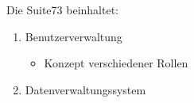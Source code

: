 Die Suite73 beinhaltet:

\begin{enumerate}
	\item Benutzerverwaltung 
	\begin{itemize}
		\item Konzept verschiedener Rollen
	\end{itemize}
	\item Datenverwaltungssystem
\end{enumerate} 






